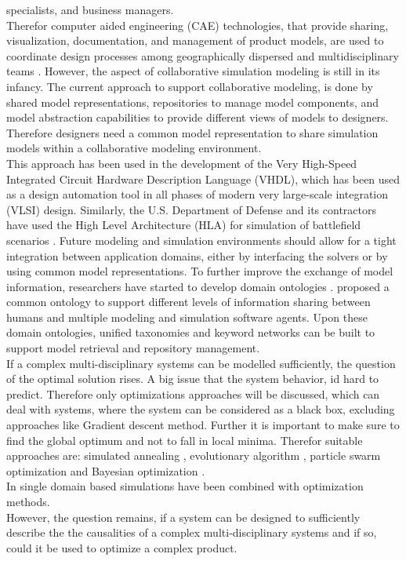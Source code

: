 specialists, and business managers.\cite{sinha_modeling_2001}\\
Therefor computer aided engineering (CAE) technologies, that provide sharing, visualization, 
documentation, and management of product models,
are used to coordinate design processes among geographically dispersed and multidisciplinary
teams \cite{finger_creating_1994, bajaj_web_1999, iwasaki_web-based_2002}.
However, the aspect of collaborative simulation modeling is still in its infancy. 
The current approach to support collaborative modeling, is done by shared model representations, 
repositories to manage model components, and model abstraction capabilities to provide different views of models to designers.
Therefore designers need a common model representation to share simulation models within a collaborative modeling environment.\cite{sinha_modeling_2001}\\
This approach has been used in the development of the Very High-Speed Integrated Circuit Hardware Description Language (VHDL),
which has been used as a design automation tool in all phases of modern very large-scale integration (VLSI) design. 
Similarly, the U.S. Department of Defense and its contractors have used the High Level Architecture (HLA) for simulation of
battlefield scenarios \cite{lutz_high_1998,park_relational_1994}.
Future modeling and simulation environments should allow for a tight integration
between application domains, either by interfacing the solvers or by using common model representations.
To further improve the exchange of model information, researchers have started to develop domain ontologies \cite{devedzic_survey_1999}. 
\cite{ozawa_model_2000} proposed a common ontology to support different levels of information sharing between humans and multiple
modeling and simulation software agents. 
Upon these domain ontologies, unified taxonomies and keyword networks
can be built to support model retrieval and repository management.\\
If a complex multi-disciplinary systems can be modelled sufficiently, the question of the optimal solution rises.
A big issue that the system behavior, id hard to predict.
Therefore only optimizations approaches will be discussed, which can deal with systems,
where the system can be considered as a black box, excluding approaches like Gradient descent method.
Further it is important to make sure to find the global optimum and not to fall in local minima.
Therefor suitable approaches are: simulated annealing \cite{khachaturyan_thermodynamic_1981}, 
evolutionary algorithm \cite{wu_ensemble_2019}, particle swarm optimization \cite{Kennedy1995} and Bayesian optimization \cite{marcuk_optimization_1975}.\\
In \cite{hornby_automated_2006, khalafallah_electimize_2011, evans_aerodynamic_2017, slagter_perform_2020}
single domain based simulations have been combined with optimization methods.\\
However, the question remains, if a system can be designed to sufficiently describe the  
the causalities of a complex multi-disciplinary systems and if so, 
could it be used to optimize a complex product.